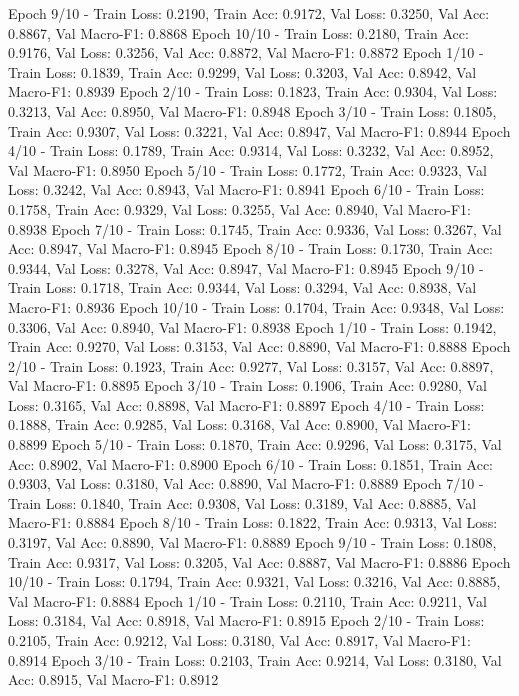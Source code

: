 \documentclass{article}
\begin{document}
Epoch 9/10 - Train Loss: 0.2190, Train Acc: 0.9172, Val Loss: 0.3250, Val Acc: 0.8867, Val Macro-F1: 0.8868
Epoch 10/10 - Train Loss: 0.2180, Train Acc: 0.9176, Val Loss: 0.3256, Val Acc: 0.8872, Val Macro-F1: 0.8872
Epoch 1/10 - Train Loss: 0.1839, Train Acc: 0.9299, Val Loss: 0.3203, Val Acc: 0.8942, Val Macro-F1: 0.8939
Epoch 2/10 - Train Loss: 0.1823, Train Acc: 0.9304, Val Loss: 0.3213, Val Acc: 0.8950, Val Macro-F1: 0.8948
Epoch 3/10 - Train Loss: 0.1805, Train Acc: 0.9307, Val Loss: 0.3221, Val Acc: 0.8947, Val Macro-F1: 0.8944
Epoch 4/10 - Train Loss: 0.1789, Train Acc: 0.9314, Val Loss: 0.3232, Val Acc: 0.8952, Val Macro-F1: 0.8950
Epoch 5/10 - Train Loss: 0.1772, Train Acc: 0.9323, Val Loss: 0.3242, Val Acc: 0.8943, Val Macro-F1: 0.8941
Epoch 6/10 - Train Loss: 0.1758, Train Acc: 0.9329, Val Loss: 0.3255, Val Acc: 0.8940, Val Macro-F1: 0.8938
Epoch 7/10 - Train Loss: 0.1745, Train Acc: 0.9336, Val Loss: 0.3267, Val Acc: 0.8947, Val Macro-F1: 0.8945
Epoch 8/10 - Train Loss: 0.1730, Train Acc: 0.9344, Val Loss: 0.3278, Val Acc: 0.8947, Val Macro-F1: 0.8945
Epoch 9/10 - Train Loss: 0.1718, Train Acc: 0.9344, Val Loss: 0.3294, Val Acc: 0.8938, Val Macro-F1: 0.8936
Epoch 10/10 - Train Loss: 0.1704, Train Acc: 0.9348, Val Loss: 0.3306, Val Acc: 0.8940, Val Macro-F1: 0.8938
Epoch 1/10 - Train Loss: 0.1942, Train Acc: 0.9270, Val Loss: 0.3153, Val Acc: 0.8890, Val Macro-F1: 0.8888
Epoch 2/10 - Train Loss: 0.1923, Train Acc: 0.9277, Val Loss: 0.3157, Val Acc: 0.8897, Val Macro-F1: 0.8895
Epoch 3/10 - Train Loss: 0.1906, Train Acc: 0.9280, Val Loss: 0.3165, Val Acc: 0.8898, Val Macro-F1: 0.8897
Epoch 4/10 - Train Loss: 0.1888, Train Acc: 0.9285, Val Loss: 0.3168, Val Acc: 0.8900, Val Macro-F1: 0.8899
Epoch 5/10 - Train Loss: 0.1870, Train Acc: 0.9296, Val Loss: 0.3175, Val Acc: 0.8902, Val Macro-F1: 0.8900
Epoch 6/10 - Train Loss: 0.1851, Train Acc: 0.9303, Val Loss: 0.3180, Val Acc: 0.8890, Val Macro-F1: 0.8889
Epoch 7/10 - Train Loss: 0.1840, Train Acc: 0.9308, Val Loss: 0.3189, Val Acc: 0.8885, Val Macro-F1: 0.8884
Epoch 8/10 - Train Loss: 0.1822, Train Acc: 0.9313, Val Loss: 0.3197, Val Acc: 0.8890, Val Macro-F1: 0.8889
Epoch 9/10 - Train Loss: 0.1808, Train Acc: 0.9317, Val Loss: 0.3205, Val Acc: 0.8887, Val Macro-F1: 0.8886
Epoch 10/10 - Train Loss: 0.1794, Train Acc: 0.9321, Val Loss: 0.3216, Val Acc: 0.8885, Val Macro-F1: 0.8884
Epoch 1/10 - Train Loss: 0.2110, Train Acc: 0.9211, Val Loss: 0.3184, Val Acc: 0.8918, Val Macro-F1: 0.8915
Epoch 2/10 - Train Loss: 0.2105, Train Acc: 0.9212, Val Loss: 0.3180, Val Acc: 0.8917, Val Macro-F1: 0.8914
Epoch 3/10 - Train Loss: 0.2103, Train Acc: 0.9214, Val Loss: 0.3180, Val Acc: 0.8915, Val Macro-F1: 0.8912
\end{document}
